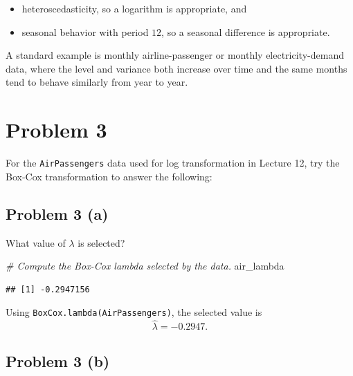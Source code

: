 \documentclass[
  10pt,
]{extarticle}
\newenvironment{Shaded}{\begin{snugshade}}{\end{snugshade}}
\newcommand{\CommentTok}[1]{\textcolor[rgb]{0.56,0.35,0.01}{\textit{#1}}}
\newcommand{\NormalTok}[1]{#1}
\providecommand{\tightlist}{%
  \setlength{\itemsep}{0pt}\setlength{\parskip}{0pt}}
\begin{document}
\begin{itemize}
\tightlist
\item
  heteroscedasticity, so a logarithm is appropriate, and
\item
  seasonal behavior with period \(12\), so a seasonal difference is appropriate.
\end{itemize}

A standard example is monthly airline-passenger or monthly electricity-demand data, where the level and variance both increase over time and the same months tend to behave similarly from year to year.

\newpage

\section{Problem 3}\label{problem-3}

\begin{problem}[Problem 3]
For the \texttt{AirPassengers} data used for log transformation in Lecture 12, try the Box-Cox transformation to answer the following:
\end{problem}

\newpage

\subsection{Problem 3 (a)}\label{problem-3-a}

\begin{problem}[Problem 3 (a)]
What value of \(\lambda\) is selected?
\end{problem}

\begin{Shaded}
\begin{Highlighting}[]
\CommentTok{\# Compute the Box{-}Cox lambda selected by the data.}
\NormalTok{air\_lambda}
\end{Highlighting}
\end{Shaded}

\begin{verbatim}
## [1] -0.2947156
\end{verbatim}

Using \texttt{BoxCox.lambda(AirPassengers)}, the selected value is
\[
\hat{\lambda} = -0.2947.
\]

\newpage

\subsection{Problem 3 (b)}\label{problem-3-b}
\end{document}
